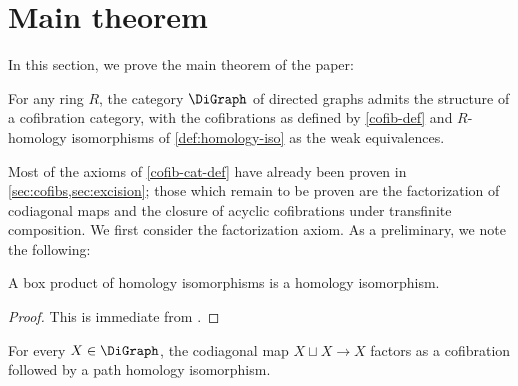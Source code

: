 \section{Main theorem}\label{sec:main-thm}

In this section, we prove the main theorem of the paper:

\begin{theorem} \label{cofib-cat}
For any ring $R$, the category $\DiGraph$ of directed graphs admits the structure of a cofibration category, with the cofibrations as defined by \cref{cofib-def} and $R$-homology isomorphisms of \cref{def:homology-iso} as the weak equivalences.
\end{theorem}

Most of the axioms of \cref{cofib-cat-def} have already been proven in \cref{sec:cofibs,sec:excision}; those which remain to be proven are the factorization of codiagonal maps and the closure of acyclic cofibrations under transfinite composition. We first consider the factorization axiom. As a preliminary, we note the following:

\begin{proposition}\label{box-prod-weqs}
A box product of homology isomorphisms is a homology isomorphism.
\end{proposition}

\begin{proof}
This is immediate from \cite[Thm.~4.7]{grigor'yan-muranov-yau}.
\end{proof}

\begin{proposition}\label{codiag-factor}
For every $X \in \DiGraph$, the codiagonal map $X \sqcup X \to X$ factors as a cofibration followed by a path homology isomorphism.
\end{proposition}

